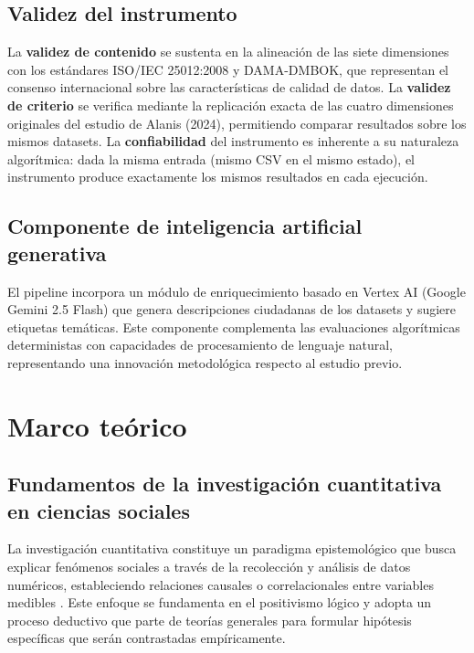 \documentclass[12pt,letterpaper]{article}
\begin{document}
\subsection{Validez del instrumento}

La \textbf{validez de contenido} se sustenta en la alineación de las siete dimensiones con los estándares ISO/IEC 25012:2008 y DAMA-DMBOK, que representan el consenso internacional sobre las características de calidad de datos. La \textbf{validez de criterio} se verifica mediante la replicación exacta de las cuatro dimensiones originales del estudio de Alanis (2024), permitiendo comparar resultados sobre los mismos datasets. La \textbf{confiabilidad} del instrumento es inherente a su naturaleza algorítmica: dada la misma entrada (mismo CSV en el mismo estado), el instrumento produce exactamente los mismos resultados en cada ejecución.

\subsection{Componente de inteligencia artificial generativa}

El pipeline incorpora un módulo de enriquecimiento basado en Vertex AI (Google Gemini 2.5 Flash) que genera descripciones ciudadanas de los datasets y sugiere etiquetas temáticas. Este componente complementa las evaluaciones algorítmicas deterministas con capacidades de procesamiento de lenguaje natural, representando una innovación metodológica respecto al estudio previo.

\section{Marco teórico}

\subsection{Fundamentos de la investigación cuantitativa en ciencias sociales}

La investigación cuantitativa constituye un paradigma epistemológico que busca explicar fenómenos sociales a través de la recolección y análisis de datos numéricos, estableciendo relaciones causales o correlacionales entre variables medibles \parencite{hernandez2014}. Este enfoque se fundamenta en el positivismo lógico y adopta un proceso deductivo que parte de teorías generales para formular hipótesis específicas que serán contrastadas empíricamente.
\end{document}
